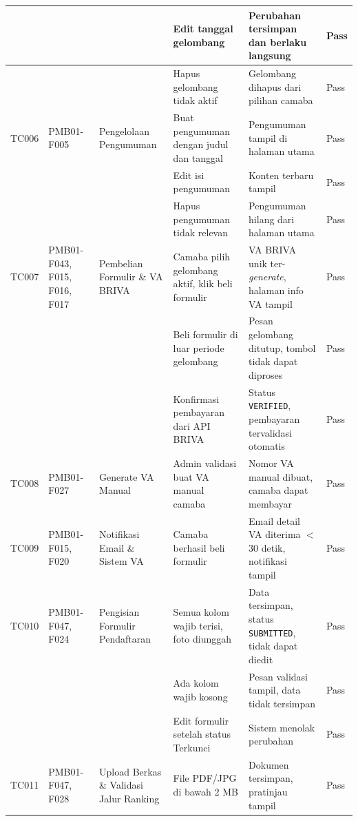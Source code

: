 \begin{longtable}{|T{0.05\textwidth}|T{0.10\textwidth}|T{0.13\textwidth}|T{0.21\textwidth}|T{0.19\textwidth}|T{0.09\textwidth}|}
	\hline
	       &            &                       & Edit tanggal gelombang & Perubahan tersimpan dan berlaku langsung & Pass \\
	\hline
	       &            &                       & Hapus gelombang tidak aktif & Gelombang dihapus dari pilihan camaba & Pass \\
	\hline
	TC006 & PMB01-F005 & Pengelolaan Pengumuman & Buat pengumuman dengan judul dan tanggal & Pengumuman tampil di halaman utama & Pass \\
	\hline
	       &            &                        & Edit isi pengumuman & Konten terbaru tampil & Pass \\
	\hline
	       &            &                        & Hapus pengumuman tidak relevan & Pengumuman hilang dari halaman utama & Pass \\
	\hline
	TC007 & PMB01-F043, F015, F016, F017 & Pembelian Formulir \& VA BRIVA & Camaba pilih gelombang aktif, klik beli formulir & VA BRIVA unik ter-\textit{generate}, halaman info VA tampil & Pass \\
	\hline
	       &            &                       & Beli formulir di luar periode gelombang & Pesan gelombang ditutup, tombol tidak dapat diproses & Pass \\
	\hline
	       &            &                       & Konfirmasi pembayaran dari API BRIVA & Status \texttt{VERIFIED}, pembayaran tervalidasi otomatis & Pass \\
	\hline
	TC008 & PMB01-F027 & Generate VA Manual & Admin validasi buat VA manual camaba & Nomor VA manual dibuat, camaba dapat membayar & Pass \\
	\hline
	TC009 & PMB01-F015, F020 & Notifikasi Email \& Sistem VA & Camaba berhasil beli formulir & Email detail VA diterima $<$30 detik, notifikasi tampil & Pass \\
	\hline
	TC010 & PMB01-F047, F024 & Pengisian Formulir Pendaftaran & Semua kolom wajib terisi, foto diunggah & Data tersimpan, status \texttt{SUBMITTED}, tidak dapat diedit & Pass \\
	\hline
	       &            &                     & Ada kolom wajib kosong & Pesan validasi tampil, data tidak tersimpan & Pass \\
	\hline
	       &            &                     & Edit formulir setelah status Terkunci & Sistem menolak perubahan & Pass \\
	\hline
	TC011 & PMB01-F047, F028 & Upload Berkas \& Validasi Jalur Ranking & File PDF/JPG di bawah 2 MB & Dokumen tersimpan, pratinjau tampil & Pass \\

\end{longtable}
